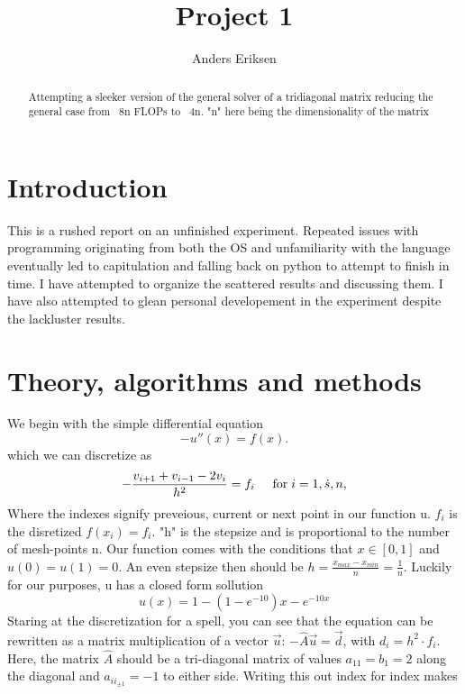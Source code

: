 \documentclass[10pt, twocolumn]{revtex4-1}
\begin{document}
\title{Project 1}
\author{Anders Eriksen}
\begin{abstract}
Attempting a sleeker version of the general solver of a tridiagonal matrix reducing the general case from ~8n FLOPs to ~4n. "n" here being the dimensionality of the matrix
\end{abstract}
\maketitle

\section{Introduction}
This is a rushed report on an unfinished experiment. Repeated issues with programming originating from both the OS and unfamiliarity with the language eventually led to capitulation and falling back on python to attempt to finish in time. I have attempted to organize the scattered results and discussing them. I have also attempted to glean personal developement in the experiment despite the lackluster results. 

\section{Theory, algorithms and methods}
We begin with the simple differential equation 
\begin{equation*}
-u''(x) = f(x).
\end{equation*}
which we can discretize as 
\begin{equation*}
   -\frac{v_{i+1}+v_{i-1}-2v_i}{h^2} = f_i  \hspace{0.5cm} \mathrm{for} \hspace{0.1cm} i=1,\dot    s, n,
\end{equation*}
Where the indexes signify preveious, current or next point in our function u. $f_i$ is the disretized $f(x_i) = f_i$. "h" is the stepsize and is proportional to the number of mesh-points n. Our function comes with the conditions that $x \in [0,1]$ and $u(0)=u(1)=0$. An even stepsize then should be $h = \frac{x_{max}- x_{min}}{n} = \frac{1}{n}$. Luckily for our purposes, u has a closed form sollution 
\begin{equation*}
	u(x) = 1-(1-e^{-10})x-e^{-10x}
\end{equation*}
Staring at the discretization for a spell, you can see that the equation can be rewritten as a matrix multiplication of a vector $\vec{u}$: $-\hat{A}\vec{u}=\vec{d}$, with $d_i = h^2\cdot f_i$.  Here, the matrix $\hat{A}$ should be a tri-diagonal matrix of values $a_{11} = b_1 = 2$ along the diagonal and $a_{ii_{\pm 1}} = -1$ to either side. Writing this out index for index makes
\end{document}
